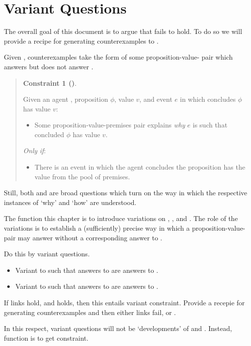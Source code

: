 \chapter{Variant Questions}
\label{cha:var}

\begin{note}
  The overall goal of this document is to argue that \issueInclusion{} fails to hold.
  To do so we will provide a recipe for generating counterexamples to \issueInclusion{}.

  Given \issueInclusion{}, counterexamples take the form of some proposition-value-\pool{} pair which answers \qWhy{} but does not answer \qHow{}.

  \begin{quote}
    \textbf{Constraint 1 (\issueInclusion{})}.

    Given an agent \vAgent{}, proposition \(\phi\), value \(v\), and event \(e\) in which \vAgent{} concludes \(\phi\) has value \(v\):
    \begin{itemize}
    \item
      Some proposition-value-premises pair explains \emph{why} \(e\) is such that \vAgent{} concluded \(\phi\) has value \(v\).
    \end{itemize}
    \emph{Only if}:
    \begin{itemize}
    \item
      There is an event in which the agent concludes the proposition has the value from the pool of premises.
    \end{itemize}
  \end{quote}

  Still, both \qWhy{} and \qHow{} are broad questions which turn on the way in which the respective instances of `why' and `how' are understood.

  The function this chapter is to introduce variations on \qWhy{}, \qHow{}, and \issueInclusion{}.
  The role of the variations is to establish a (sufficiently) precise way in which a proposition-value-\pool{} pair may answer \qWhy{} without a corresponding answer to \qHow{}.
\end{note}

\begin{note}
  Do this by variant questions.

  \begin{itemize}
  \item
    Variant to \qWhy{} such that answers to \qWhyV{} are answers to \qWhy{}.
  \item
    Variant to \qHow{} such that answers to \qHow{} are answers to \qHowV{}.
  \end{itemize}

  If links hold, and \issueConstraint{} holds, then this entails variant constraint.
  Provide a recepie for generating counterexamples and then either links fail, or \issueConstraint{}.

  In this respect, variant questions will not be `developments' of \qWhy{} and \qHow{}.
  Instead, function is to get constraint.
\end{note}

